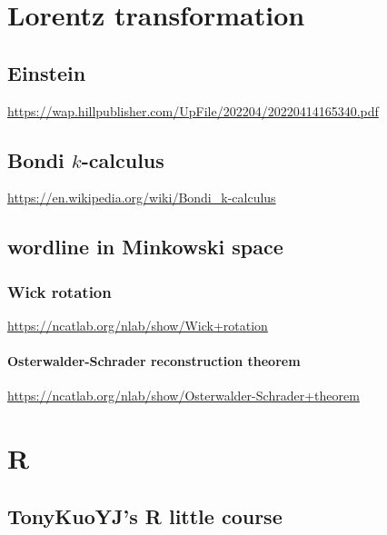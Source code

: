 \documentclass[
]{book}
\theoremstyle{definition}
\theoremstyle{definition}
\theoremstyle{definition}
\theoremstyle{definition}
\theoremstyle{remark}
\begin{document}
\hypertarget{lorentz-transformation}{%
\chapter{Lorentz transformation}\label{lorentz-transformation}}

\hypertarget{einstein}{%
\section{Einstein}\label{einstein}}

\url{https://wap.hillpublisher.com/UpFile/202204/20220414165340.pdf}

\hypertarget{bondi-k-calculus}{%
\section{\texorpdfstring{Bondi \(k\)-calculus}{Bondi k-calculus}}\label{bondi-k-calculus}}

\url{https://en.wikipedia.org/wiki/Bondi_k-calculus}

\hypertarget{wordline-in-minkowski-space}{%
\section{wordline in Minkowski space}\label{wordline-in-minkowski-space}}

\hypertarget{wick-rotation}{%
\subsection{Wick rotation}\label{wick-rotation}}

\url{https://ncatlab.org/nlab/show/Wick+rotation}

\hypertarget{osterwalder-schrader-reconstruction-theorem}{%
\subsubsection{Osterwalder-Schrader reconstruction theorem}\label{osterwalder-schrader-reconstruction-theorem}}

\url{https://ncatlab.org/nlab/show/Osterwalder-Schrader+theorem}

\hypertarget{r}{%
\chapter{R}\label{r}}

\hypertarget{tonykuoyjs-r-little-course}{%
\section{TonyKuoYJ's R little course}\label{tonykuoyjs-r-little-course}}
\end{document}
